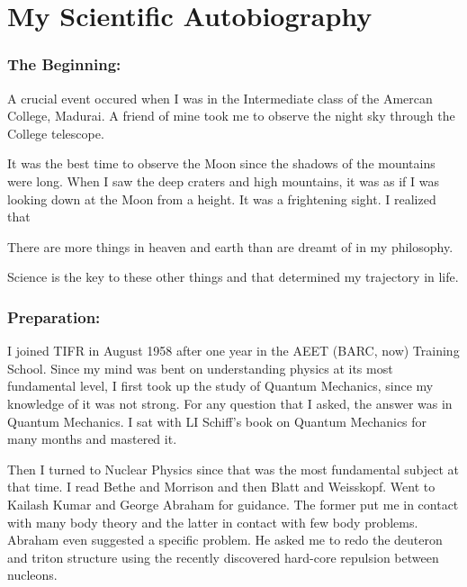 \chapter{My Scientific Autobiography}

\subsection*{The Beginning:}

A crucial event occured when I was in the Intermediate class of the 
Amercan College, Madurai. A friend of mine took me to observe the night 
sky through the College telescope.


It was the best time to observe the Moon since the shadows of the 
mountains were long. When I saw the deep craters and high mountains, it 
was as if I was looking down at the Moon from a height. It was a 
frightening sight. I realized that


There are more things in heaven and earth than are dreamt of in my 
philosophy.


Science is the key to these other things and that determined my 
trajectory in life.


\vspace{-.3cm}

\subsection*{Preparation:}

\vspace{-.2cm}

I joined TIFR in August 1958 after one year in the AEET (BARC, now) 
Training School.  Since my mind was bent on understanding physics at its 
most fundamental level, I first took up the study of Quantum Mechanics, 
since my knowledge of it was not strong. For any question that I asked, 
the answer was in Quantum Mechanics. I sat with LI Schiff's book on 
Quantum Mechanics for many months and mastered it.

Then I turned to Nuclear Physics since that was the most fundamental 
subject at that time. I read Bethe and Morrison and then Blatt and 
Weisskopf. Went to Kailash Kumar and George Abraham for guidance. The 
former put me in contact with many body theory and the latter in contact 
with few body problems. Abraham even suggested a specific problem. He 
asked me to redo the deuteron and triton structure using the recently 
discovered hard-core repulsion between nucleons.


